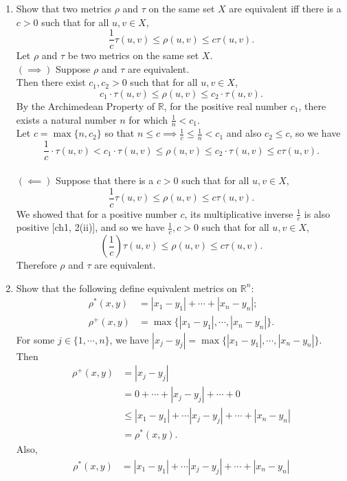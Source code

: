 \begin{enumerate}
	\setcounter{enumi}{0}
	\item Show that two metrics $\rho$ and $\tau$ on the same set $X$ are equivalent iff there is a $c>0$ such that for all $u,v\in X$,
	\[
        \frac{1}{c}\tau(u,v)\le\rho(u,v)\le c\tau(u,v).    
    \]
    Let $\rho$ and $\tau$ be two metrics on the same set $X$.\\
    $(\implies)$ Suppose $\rho$ and $\tau$ are equivalent.\\
    Then there exist $c_1,c_2>0$ such that for all $u,v\in X$,
    \[
    c_1\cdot \tau(u,v)\le\rho(u,v)\le c_2\cdot\tau(u,v).    
    \]
    By the Archimedean Property of $\mathbb{R}$, for the positive real number $c_1$, there exists a natural number $n$ for which $\frac{1}{n}<c_1$.\\
    Let $c=\max\{n,c_2\}$ so that $n\le c \implies \frac{1}{c}\le\frac{1}{n}<c_1$ and also $c_2\le c$, so we have
    \[
        \frac{1}{c}\cdot \tau(u,v)<c_1\cdot \tau(u,v)\le\rho(u,v)\le c_2\cdot\tau(u,v) \le c\tau(u,v).
    \]
    \\
    $(\impliedby)$ Suppose that there is a $c>0$ such that for all $u,v\in X$,
	\[
        \frac{1}{c}\tau(u,v)\le\rho(u,v)\le c\tau(u,v).    
    \]
    We showed that for a positive number $c$, its multiplicative inverse $\frac{1}{c}$ is also positive [ch1, 2(ii)], and so we have $\frac{1}{c},c>0$ such that for all $u,v\in X$,
    \[
        (\frac{1}{c})\tau(u,v)\le\rho(u,v)\le c\tau(u,v).    
    \]
    Therefore $\rho$ and $\tau$ are equivalent.
    \item Show that the following define equivalent metrics on $\mathbb{R}^n$:
    \begin{align*}
        \rho^*(x,y) &= |x_1-y_1| + \cdots + |x_n-y_n|;\\
        \rho^+(x,y) &= \max\{|x_1-y_1|, \cdots,|x_n-y_n|\}.
    \end{align*}
    For some $j\in\{1,\cdots,n\}$, we have $|x_j-y_j|=\max\{|x_1-y_1|, \cdots,|x_n-y_n|\}$.\\
    Then 
    \begin{align*}
        \rho^+(x,y) &= |x_j-y_j|\\
        &= 0+\cdots +|x_j-y_j|+\cdots+0\\
        &\le |x_1-y_1| + \cdots|x_j-y_j|+\cdots + |x_n-y_n|\\
        &= \rho^*(x,y).
    \end{align*}
    Also,
    \begin{align*}
        \rho^*(x,y) &= |x_1-y_1| + \cdots|x_j-y_j|+\cdots + |x_n-y_n|\\

\end{align*}
\end{enumerate}
